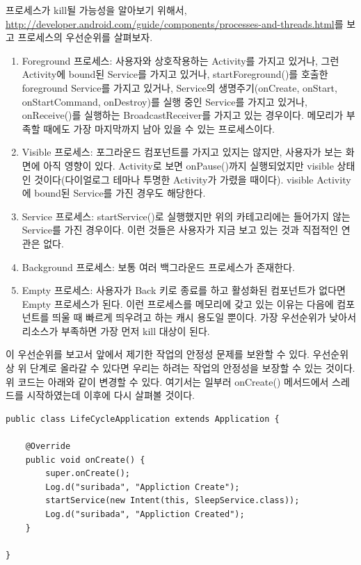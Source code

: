 프로세스가 kill될 가능성을 알아보기 위해서, 
\url{http://developer.android.com/guide/components/processes-and-threads.html}를 보고 프로세스의 우선순위를 살펴보자.
\begin{enumerate}
\item Foreground 프로세스: 사용자와 상호작용하는 Activity를 가지고 있거나, 그런 Activity에 bound된 Service를 가지고 있거나, startForeground()를 호출한 foreground Service를 가지고 있거나, Service의 생명주기(onCreate, onStart, onStartCommand, onDestroy)를 실행 중인 Service를 가지고 있거나, onReceive()를 실행하는 BroadcastReceiver를 가지고 있는 경우이다.
메모리가 부족할 때에도 가장 마지막까지 남아 있을 수 있는 프로세스이다.
\item Visible 프로세스: 포그라운드 컴포넌트를 가지고 있지는 않지만, 사용자가 보는 화면에 아직 영향이 있다. Activity로 보면 onPause()까지 실행되었지만 visible 상태인 것이다(다이얼로그 테마나 투명한 Activity가 가렸을 때이다).
visible Activity에 bound된 Service를 가진 경우도 해당한다. 
\item Service 프로세스: startService()로 실행했지만 위의 카테고리에는 들어가지 않는 Service를 가진 경우이다. 이런 것들은 사용자가 지금 보고 있는 것과 직접적인 연관은 없다.
\item Background 프로세스: 보통 여러 백그라운드 프로세스가 존재한다.
\item Empty 프로세스: 사용자가 Back 키로 종료를 하고 활성화된 컴포넌트가 없다면 Empty 프로세스가 된다. 이런 프로세스를 메모리에 갖고 있는 이유는 다음에 컴포넌트를 띄울 때 빠르게 띄우려고 하는 캐시 용도일 뿐이다. 가장 우선순위가 낮아서 리소스가 부족하면 가장 먼저 kill 대상이 된다.
\end{enumerate}

이 우선순위를 보고서 앞에서 제기한 작업의 안정성 문제를 보완할 수 있다. 우선순위상 위 단계로 올라갈 수 있다면 우리는 하려는 작업의 안정성을 보장할 수 있는 것이다. 
위 코드는 아래와 같이 변경할 수 있다. 여기서는 일부러 onCreate() 메서드에서 스레드를 시작하였는데 이후에 다시 살펴볼 것이다.

\begin{lstlisting}[frame=single]
public class LifeCycleApplication extends Application {
		
	@Override
	public void onCreate() {
		super.onCreate();
		Log.d("suribada", "Appliction Create");
		startService(new Intent(this, SleepService.class));
		Log.d("suribada", "Appliction Created");
	}

}
\end{lstlisting}


